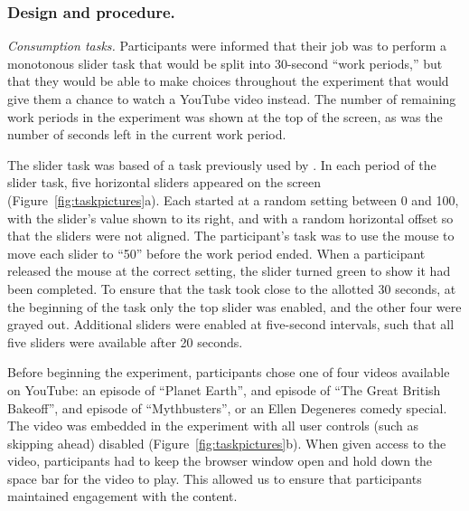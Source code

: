 \documentclass[10pt,letterpaper]{article}
\begin{document}
\subsubsection{Design and procedure.}





\emph{Consumption tasks.}
Participants were informed that their job was to perform a monotonous slider task that
would be split into 30-second ``work periods,'' but that they would be able to
make choices throughout the experiment that would give them a chance to watch a
YouTube video instead. The number of remaining work periods in the experiment was shown
at the top of the screen, as was the number of seconds left in the current work period.

The slider task was based of a task previously used by \citet{Gill2012}. In each
period of the slider task, five horizontal sliders appeared on the screen (Figure~\ref{fig:taskpictures}a). Each
started at a random setting between 0 and 100, with the slider's value
shown to its right, and with a random horizontal offset so that the
sliders were not aligned. The participant's task was to use the mouse to move
each slider to ``50'' before the work period ended. When a participant released
the mouse at the correct setting, the slider turned green to show it had been
completed. To ensure that the task took close to the allotted 30 seconds, at the
beginning of the task only the top slider was enabled, and the other four were
grayed out. Additional sliders were enabled at five-second intervals, such that
all five sliders were available after 20 seconds.

Before beginning the experiment, participants chose one of four videos available
on YouTube: an episode of ``Planet Earth'', and episode of ``The Great British
Bakeoff'', and episode of ``Mythbusters'', or an Ellen Degeneres comedy special.
The video was embedded in the experiment with all user controls (such as
skipping ahead) disabled (Figure~\ref{fig:taskpictures}b). When given access to the video, participants had to keep the
browser window open and hold down the space bar for the video to play. This allowed us to ensure that
participants maintained engagement with the content.
\end{document}
